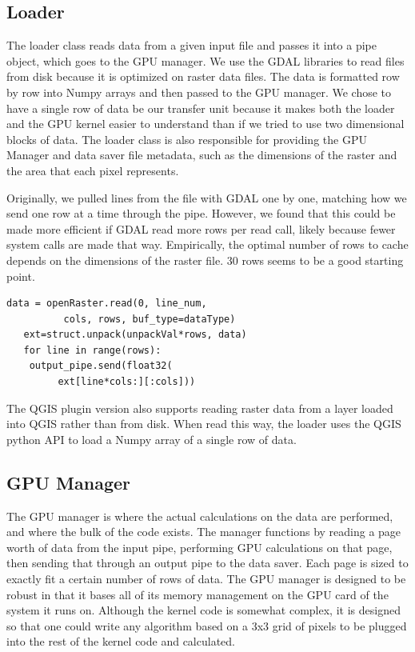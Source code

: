 \documentclass[journal]{IEEEtran}
\begin{document}
    \subsection{Loader}
    The loader class reads data from a given input file and passes it into
    a pipe object, which goes to the GPU manager. We use the GDAL libraries to
    read files from disk because it is optimized on raster data files. The data is
    formatted row by row into Numpy arrays and then passed to the GPU manager.
    We chose to have a single row of data be our transfer unit because it makes
    both the loader and the GPU kernel easier to understand than if we tried to
    use two dimensional blocks of data. The loader class is also responsible
    for providing the GPU Manager and data saver file metadata, such as the
    dimensions of the raster and the area that each pixel represents.

    Originally, we pulled lines from the file with GDAL one by one, matching
    how we send one row at a time through the pipe. However, we found that this
    could be made more efficient if GDAL read more rows per read call, likely
    because fewer system calls are made that way. Empirically, the optimal number
    of rows to cache depends on the dimensions of the raster file. 30 rows seems
    to be a good starting point.

\begin{Verbatim}[frame=single, gobble=2]
   data = openRaster.read(0, line_num, 
	      cols, rows, buf_type=dataType)
   ext=struct.unpack(unpackVal*rows, data)
   for line in range(rows):
    output_pipe.send(float32(
	     ext[line*cols:][:cols]))
\end{Verbatim}

    The QGIS plugin version also supports reading raster data from a layer loaded
    into QGIS rather than from disk. When read this way, the loader uses the QGIS
    python API to load a Numpy array of a single row of data.

    \subsection{GPU Manager}
    The GPU manager is where the actual calculations on the data are performed,
    and where the bulk of the code exists. The manager functions by reading a
    page worth of data from the input pipe, performing GPU calculations on that
    page, then sending that through an output pipe to the data saver. Each page
    is sized to exactly fit a certain number of rows of data. The GPU manager
    is designed to be robust in that it bases all of its memory management on
    the GPU card of the system it runs on. Although the kernel code is somewhat
    complex, it is designed so that one could write any algorithm based on a
    3x3 grid of pixels to be plugged into the rest of the kernel code and calculated.
\end{document}
